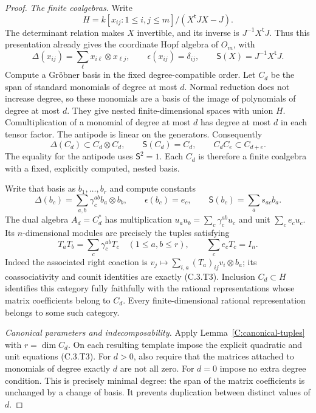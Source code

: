 \begin{proof}
\emph{The finite coalgebras.}
Write
\[
 H=k[x_{ij}:1\leq i,j\leq m]/(X^{\mathsf t}JX-J).
\]
The determinant relation makes $X$ invertible, and its inverse is
$J^{-1}X^{\mathsf t}J$. Thus this presentation already gives the coordinate
Hopf algebra of $O_m$, with
\[
 \Delta(x_{ij})=\sum_\ell x_{i\ell}\otimes x_{\ell j},\qquad
 \epsilon(x_{ij})=\delta_{ij},\qquad
 \mathsf S(X)=J^{-1}X^{\mathsf t}J .
\]
Compute a Gr\"obner basis in the fixed degree-compatible order. Let $C_d$
be the span of standard monomials of degree at most $d$. Normal reduction
does not increase degree, so these monomials are a basis of the image of
polynomials of degree at most $d$. They give nested finite-dimensional
spaces with union $H$. Comultiplication of a monomial of degree at most
$d$ has degree at most $d$ in each tensor factor. The antipode is linear
on the generators. Consequently
\[
 \Delta(C_d)\subset C_d\otimes C_d,\qquad
 \mathsf S(C_d)=C_d,\qquad C_d C_e\subset C_{d+e}.
                                                        \tag{C.3.T1}
\]
The equality for the antipode uses $\mathsf S^2=1$. Each $C_d$ is therefore
a finite coalgebra with a fixed, explicitly computed, nested basis.

Write that basis as $b_1,\ldots,b_r$ and compute constants
\[
 \Delta(b_c)=\sum_{a,b}\gamma_c^{ab}b_a\otimes b_b,\qquad
 \epsilon(b_c)=e_c,\qquad
 \mathsf S(b_c)=\sum_a s_{ac}b_a .
                                                        \tag{C.3.T2}
\]
The dual algebra $A_d=C_d^*$ has multiplication
$u_a u_b=\sum_c\gamma_c^{ab}u_c$ and unit $\sum_c e_c u_c$.
Its $n$-dimensional modules are precisely the tuples satisfying
\[
 T_aT_b=\sum_c\gamma_c^{ab}T_c\quad(1\leq a,b\leq r),
 \qquad \sum_c e_cT_c=I_n .                              \tag{C.3.T3}
\]
Indeed the associated right coaction is
$v_j\mapsto\sum_{i,a}(T_a)_{ij}v_i\otimes b_a$; its coassociativity and
counit identities are exactly (C.3.T3). Inclusion $C_d\subset H$ identifies
this category fully faithfully with the rational representations whose
matrix coefficients belong to $C_d$. Every finite-dimensional rational
representation belongs to some such category.

\emph{Canonical parameters and indecomposability.}
Apply Lemma~\ref{C:canonical-tuples} with $r=\dim C_d$. On each resulting
template impose the explicit quadratic and unit equations (C.3.T3).
For $d>0$, also require that the matrices attached to monomials of degree
exactly $d$ are not all zero. For $d=0$ impose no extra degree condition.
This is precisely minimal degree: the span of the matrix coefficients is
unchanged by a change of basis. It prevents duplication between distinct
values of $d$.


\end{proof}
